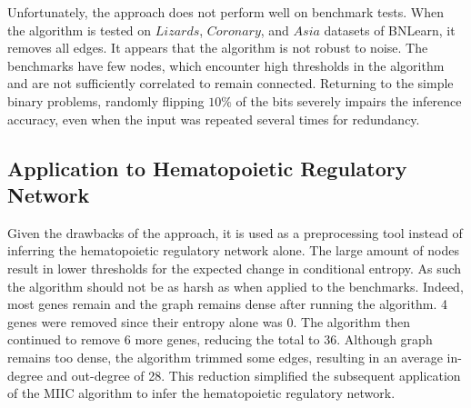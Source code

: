 \documentclass[11pt]{amsart}
\begin{document}
Unfortunately, the approach does not perform well on benchmark tests. When the algorithm is tested on $Lizards$, $Coronary$, and $Asia$ datasets of BNLearn, it removes all edges. It appears that the algorithm is not robust to noise. The benchmarks have few nodes, which encounter high thresholds in the algorithm and are not sufficiently correlated to remain connected. Returning to the simple binary problems, randomly flipping $10\%$ of the bits severely impairs the inference accuracy, even when the input was repeated several times for redundancy. 
\\

\subsection{Application to Hematopoietic Regulatory Network}
Given the drawbacks of the approach, it is used as a preprocessing tool instead of inferring the hematopoietic regulatory network alone. The large amount of nodes result in lower thresholds for the expected change in conditional entropy. As such the algorithm should not be as harsh as when applied to the benchmarks. Indeed, most genes remain and the graph remains dense after running the algorithm. 4 genes were removed since their entropy alone was 0. The algorithm then continued to remove 6 more genes, reducing the total to 36. Although graph remains too dense, the algorithm trimmed some edges, resulting in an average in-degree and out-degree of 28. This reduction simplified the subsequent application of the MIIC algorithm to infer the hematopoietic regulatory network.
\end{document}
